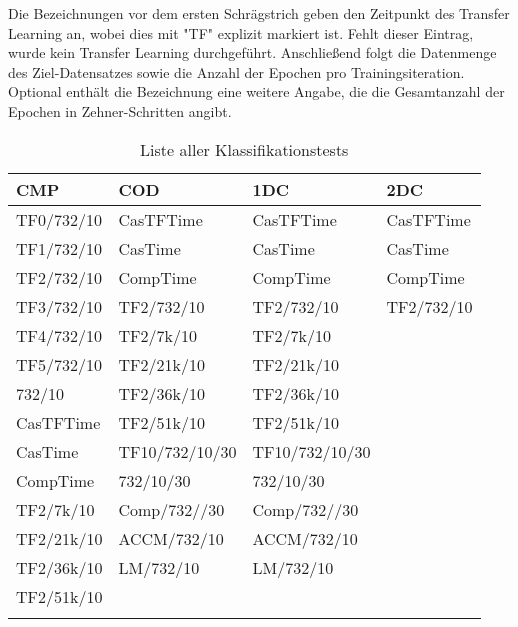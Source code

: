 Die Bezeichnungen vor dem ersten Schrägstrich geben den Zeitpunkt des Transfer Learning an, wobei dies mit "TF" explizit markiert ist. Fehlt dieser 
Eintrag, wurde kein Transfer Learning durchgeführt. Anschließend folgt die Datenmenge des Ziel-Datensatzes sowie die Anzahl der Epochen pro 
Trainingsiteration. Optional enthält die Bezeichnung eine weitere Angabe, die die Gesamtanzahl der Epochen in Zehner-Schritten angibt.

\begin{table}[!ht]
    \centering
    \begin{tabular}{l|l|l|l}
        \textbf{CMP} & \textbf{COD} & \textbf{1DC} & \textbf{2DC} \\
        \hline
        TF0/732/10 & CasTFTime & CasTFTime & CasTFTime \\
        TF1/732/10 & CasTime & CasTime & CasTime \\
        TF2/732/10 & CompTime & CompTime & CompTime \\
        TF3/732/10 & TF2/732/10 & TF2/732/10 & TF2/732/10 \\
        TF4/732/10 & TF2/7k/10 & TF2/7k/10 & \\
        TF5/732/10 & TF2/21k/10 & TF2/21k/10 & \\
        732/10 & TF2/36k/10 & TF2/36k/10 & \\
        CasTFTime & TF2/51k/10 & TF2/51k/10 & \\
        CasTime & TF10/732/10/30 & TF10/732/10/30 & \\
        CompTime & 732/10/30 & 732/10/30 & \\
        TF2/7k/10 & Comp/732//30 & Comp/732//30 & \\
        TF2/21k/10 & ACCM/732/10 & ACCM/732/10 & \\
        TF2/36k/10 & LM/732/10 & LM/732/10 & \\
        TF2/51k/10 & & & \\
        & & & \\
    \end{tabular}
    \caption{\label{tab:classtests} Liste aller Klassifikationstests}
\end{table}


